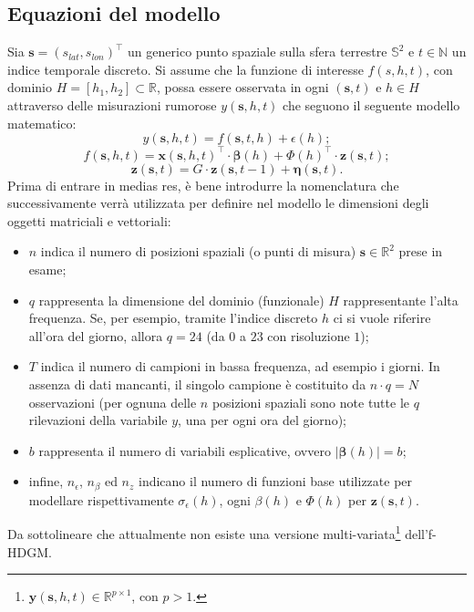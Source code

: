 \subsection[Equazioni del modello]{Equazioni del modello}
Sia $\mathbf{s} = (s_{lat}, s_{lon})^\top$ un generico punto spaziale sulla sfera terrestre $\mathbb{S}^2$ e $t\in\mathbb{N}$ un indice temporale discreto. Si assume che la funzione di interesse $f(s, h, t)$, con dominio $H=[ h_1, h_2]\subset\mathbb{R}$, possa essere osservata in ogni $(\mathbf{s}, t)$ e $h\in H$ attraverso delle misurazioni rumorose $y(\mathbf{s}, h, t)$ che seguono il seguente modello matematico:
\begin{equation}
	y(\mathbf{s}, h, t) = f(\mathbf{s}, t, h) + \epsilon(h);
	\label{eq_rumore_uscita}
\end{equation}
\begin{equation}
	f(\mathbf{s}, h, t) = \mathbf{x}(\mathbf{s}, h, t)^\top\cdot\boldsymbol{\beta}(h) + \Phi(h)^\top\cdot\mathbf{z}(\mathbf{s}, t);
	\label{eq_comp_det}
\end{equation}
\begin{equation}
	\mathbf{z}(\mathbf{s}, t) = G\cdot \mathbf{z}(\mathbf{s}, t-1) + \boldsymbol{\eta}(\mathbf{s}, t).
	\label{eq_comp_lat}
\end{equation}
Prima di entrare in medias res, è bene introdurre la nomenclatura che successivamente verrà utilizzata per definire nel modello le dimensioni degli oggetti matriciali e vettoriali:
\begin{itemize}
	\item $n$ indica il numero di posizioni spaziali (o punti di misura) $\mathbf{s}\in\mathbb{R}^2$ prese in esame;
	\item $q$ rappresenta la dimensione del dominio (funzionale) $H$ rappresentante l'alta frequenza. Se, per esempio, tramite l'indice discreto $h$ ci si vuole riferire all'ora del giorno, allora $q=24$ (da $0$ a $23$ con risoluzione $1$);
	\item $T$ indica il numero di campioni in bassa frequenza, ad esempio i giorni. In assenza di dati mancanti, il singolo campione è costituito da $n\cdot q = N$ osservazioni (per ognuna delle $n$ posizioni spaziali sono note tutte le $q$ rilevazioni della variabile $y$, una per ogni ora del giorno);
	\item $b$ rappresenta il numero di variabili esplicative, ovvero $|\boldsymbol{\beta}(h)| = b$;
	\item infine, $n_\epsilon$, $n_\beta$ ed $n_z$ indicano il numero di funzioni base utilizzate per modellare rispettivamente $\sigma_\epsilon (h)$, ogni $\beta(h)$ e $\Phi(h)$ per $\mathbf{z}(\mathbf{s}, t)$.
\end{itemize}
Da sottolineare che attualmente non esiste una versione multi-variata\footnote{$\mathbf{y}(\mathbf{s}, h, t)\in\mathbb{R}^{p\times 1}$, con $p>1$.} dell'f-HDGM.

